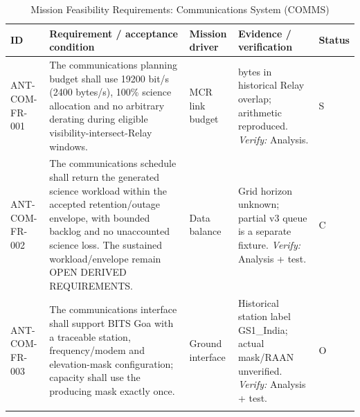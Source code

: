 \begin{table}[H]\centering\small\setlength{\tabcolsep}{3pt}
\caption{Mission Feasibility Requirements: Communications System (COMMS)}\label{tab:fr-com}
\begin{tabular}{@{}
>{\RaggedRight\arraybackslash}p{}
>{\RaggedRight\arraybackslash}p{}
>{\RaggedRight\arraybackslash}p{}
>{\RaggedRight\arraybackslash}p{}
>{\RaggedRight\arraybackslash}p{}
@{}}
\toprule ID & Requirement / acceptance condition & Mission driver & Evidence / verification & Status\\\midrule
{}\label{req:ANT-COM-FR-001}\mbox{ANT-COM-}\newline\mbox{FR-001} & The communications planning budget shall use 19200 bit/s (2400 bytes/s), 100\% science allocation and no arbitrary derating during eligible visibility-intersect-Relay windows. & MCR link budget & 428836800 bytes in historical Relay overlap; arithmetic reproduced. \emph{Verify:} Analysis. & S\\
\addlinespace[3pt]
\label{req:ANT-COM-FR-002}\mbox{ANT-COM-}\newline\mbox{FR-002} & The communications schedule shall return the generated science workload within the accepted retention/outage envelope, with bounded backlog and no unaccounted science loss. The sustained workload/envelope remain OPEN DERIVED REQUIREMENTS. & Data balance & Grid horizon unknown; partial v3 queue is a separate fixture. \emph{Verify:} Analysis + test. & C\\
\addlinespace[3pt]
\label{req:ANT-COM-FR-003}\mbox{ANT-COM-}\newline\mbox{FR-003} & The communications interface shall support BITS Goa with a traceable station, frequency/modem and elevation-mask configuration; capacity shall use the producing mask exactly once. & Ground interface & Historical station label GS1\_India; actual mask/RAAN unverified. \emph{Verify:} Analysis + test. & O\\
\addlinespace[3pt]
\bottomrule
\end{tabular}
\end{table}
